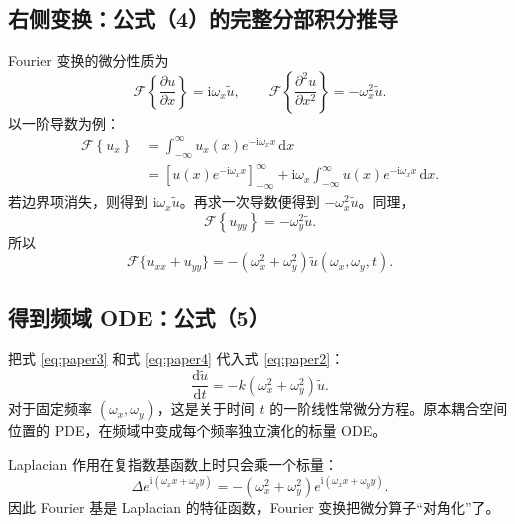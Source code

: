 \documentclass[UTF8,12pt,a4paper,fontset=none]{ctexart}
\numberwithin{equation}{section}
\newcommand{\F}{\mathcal{F}}
\newcommand{\od}{\mathrm{d}}
\newcommand{\pd}{\partial}
\begin{document}
\subsection{右侧变换：公式（4）的完整分部积分推导}

Fourier 变换的微分性质为
\begin{equation}
  \F\left\{\frac{\pd u}{\pd x}\right\}
  =\mathrm{i}\omega_x\widetilde u,
  \qquad
  \F\left\{\frac{\pd^2u}{\pd x^2}\right\}
  =-\omega_x^2\widetilde u.
\end{equation}
以一阶导数为例：
\begin{align}
  \F\left\{u_x\right\}
  &=\int_{-\infty}^{\infty}u_x(x)
  e^{-\mathrm{i}\omega_xx}\,\od x\\
  &=\left[u(x)e^{-\mathrm{i}\omega_xx}\right]_{-\infty}^{\infty}
  +\mathrm{i}\omega_x
  \int_{-\infty}^{\infty}u(x)e^{-\mathrm{i}\omega_xx}\,\od x.
\end{align}
若边界项消失，则得到 $\mathrm{i}\omega_x\widetilde u$。再求一次导数便得到 $-\omega_x^2\widetilde u$。同理，
\begin{equation}
  \F\left\{u_{yy}\right\}
  =-\omega_y^2\widetilde u.
\end{equation}
所以
\begin{equation}
  \F\{u_{xx}+u_{yy}\}
  =-(\omega_x^2+\omega_y^2)
  \widetilde u(\omega_x,\omega_y,t).
  \tag{4}
  \label{eq:paper4}
\end{equation}

\subsection{得到频域 ODE：公式（5）}

把式 \eqref{eq:paper3} 和式 \eqref{eq:paper4} 代入式 \eqref{eq:paper2}：
\begin{equation}
  \frac{\od\widetilde u}{\od t}
  =-k(\omega_x^2+\omega_y^2)\widetilde u.
  \tag{5}
  \label{eq:paper5}
\end{equation}
对于固定频率 $(\omega_x,\omega_y)$，这是关于时间 $t$ 的一阶线性常微分方程。原本耦合空间位置的 PDE，在频域中变成每个频率独立演化的标量 ODE。

\begin{keybox}[频域对角化的本质]
Laplacian 作用在复指数基函数上时只会乘一个标量：
\begin{equation}
  \Delta e^{\mathrm{i}(\omega_xx+\omega_yy)}
  =-(\omega_x^2+\omega_y^2)
  e^{\mathrm{i}(\omega_xx+\omega_yy)}.
\end{equation}
因此 Fourier 基是 Laplacian 的特征函数，Fourier 变换把微分算子“对角化”了。
\end{keybox}
\end{document}
